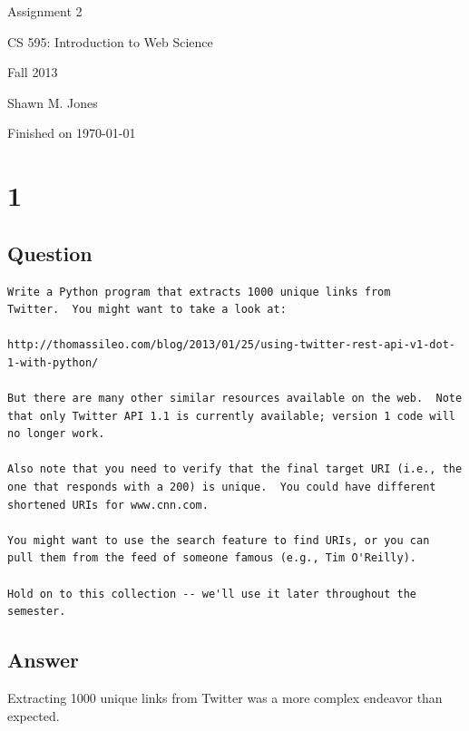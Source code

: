 \documentclass[letterpaper,11pt]{article}
\begin{document}
\begin{titlepage}

\begin{center}

\Huge{Assignment 2}

\Large{CS 595:  Introduction to Web Science}

\Large{Fall 2013}

\Large{Shawn M. Jones}

\Large Finished on \today

\end{center}

\end{titlepage}

\newpage
\section*{1}

\subsection*{Question}

\begin{verbatim}
Write a Python program that extracts 1000 unique links from
Twitter.  You might want to take a look at:

http://thomassileo.com/blog/2013/01/25/using-twitter-rest-api-v1-dot-1-with-python/

But there are many other similar resources available on the web.  Note
that only Twitter API 1.1 is currently available; version 1 code will
no longer work.

Also note that you need to verify that the final target URI (i.e., the
one that responds with a 200) is unique.  You could have different
shortened URIs for www.cnn.com.

You might want to use the search feature to find URIs, or you can
pull them from the feed of someone famous (e.g., Tim O'Reilly).

Hold on to this collection -- we'll use it later throughout the semester.
\end{verbatim}

\newpage
\subsection*{Answer}

Extracting 1000 unique links from Twitter was a more complex endeavor than expected.
\end{document}
